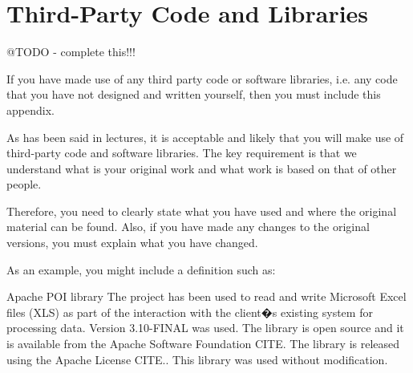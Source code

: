 \chapter{Third-Party Code and Libraries}

@TODO - complete this!!!

If you have made use of any third party code or software libraries, i.e. any code that you have not designed and written yourself, then you must include this appendix. 

As has been said in lectures, it is acceptable and likely that you will make use of third-party code and software libraries. The key requirement is that we understand what is your original work and what work is based on that of other people. 

Therefore, you need to clearly state what you have used and where the original material can be found. Also, if you have made any changes to the original versions, you must explain what you have changed. 

As an example, you might include a definition such as: 

Apache POI library
The project has been used to read and write Microsoft Excel files (XLS) as part of the interaction with the client�s existing system for processing data. Version 3.10-FINAL was used. The library is open source and it is available from the Apache Software Foundation 
CITE. The library is released using the Apache License 
CITE.. This library was used without modification. 
